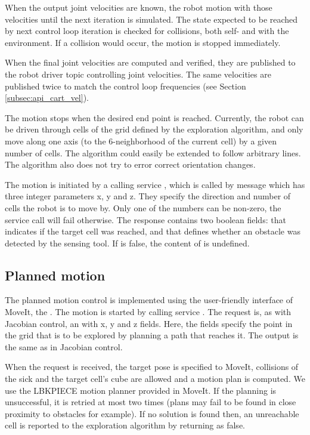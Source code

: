 \documentclass[buriama8_dp.tex]{subfiles}
\begin{document}
When the output joint velocities are known, the robot motion with those velocities until the next iteration is simulated. The state expected to be reached by next control loop iteration is checked for collisions, both self- and with the environment. If a collision would occur, the motion is stopped immediately.

When the final joint velocities are computed and verified, they are published to the robot driver topic controlling joint velocities. The same velocities are published twice to match the control loop frequencies (see Section \ref{subsec:api_cart_vel}).

The motion stops when the desired end point is reached. Currently, the robot can be driven through cells of the grid defined by the exploration algorithm, and only move along one axis (to the 6-neighborhood of the current cell) by a given number of cells. The algorithm could easily be extended to follow arbitrary lines. The algorithm also does not try to error correct orientation changes.

The motion is initiated by a calling service , which is called by message   which has three integer parameters \m x, \m y and \m z. They specify the direction and number of cells the robot is to move by. Only one of the numbers can be non-zero, the service call will fail otherwise. The response contains two boolean fields:  that indicates if the target cell was reached, and  that defines whether an obstacle was detected by the sensing tool. If  is false, the content of  is undefined.

\subsection{Planned motion}
\label{subsec:impl_drv_plan}

The planned motion control is implemented using the user-friendly interface of MoveIt, the . The motion is started by calling service . The request is, as with Jacobian control, an  with \m x, \m y and \m z fields. Here, the fields specify the point in the grid that is to be explored by planning a path that reaches it. The output is the same as in Jacobian control.

When the request is received, the target pose is specified to MoveIt, collisions of the sick and the target cell's cube are allowed and a motion plan is computed. We use the LBKPIECE motion planner provided in MoveIt. If the planning is unsuccessful, it is retried at most two times (plans may fail to be found in close proximity to obstacles for example). If no solution is found then, an unreachable cell is reported to the exploration algorithm by returning  as false.
\end{document}
